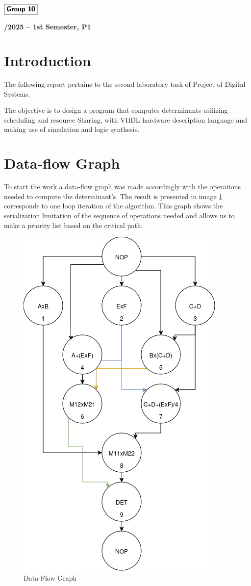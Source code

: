 \documentclass[12pt]{article}
\begin{document}
\begin{flushleft}
    \large $\boxed{\text{\bf \fontfamily{cmss}\selectfont Group 10}}$\\[4.0cm]
\end{flushleft}
    
\begin{center}
    \large \bf {}/2025 -- 1st Semester, P1
\end{center}

\thispagestyle{empty}

\setcounter{page}{0}

\newpage



\section{Introduction}
The following report pertains to the second laboratory task of Project of Digital Systems.

The objective is to design a program that computes determinants utilizing
scheduling and resource Sharing, with VHDL hardware description language and making use of simulation and logic synthesis. 

\section{Data-flow Graph}
To start the work a data-flow graph was made accordingly with the operations needed to compute the determinant's. The result is presented in image \ref{fig:data} corresponds to one loop iteration of the algorithm. This graph shows the serialization limitation of the sequence of operations needed and allows us to make a priority list based on the critical path.

\begin{figure}[H]
	\centering
	\includegraphics[width=0.35\linewidth]{Imagens/flowdat.drawio.png}
	\caption{Data-Flow Graph}
	\label{fig:data}
\end{figure}
\end{document}

